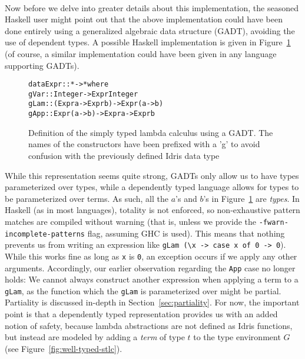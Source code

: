 \paragraph{}
Now before we delve into greater details about this implementation, the seasoned Haskell user might point out that the above implementation could have been done entirely using a generalized algebraic data structure (GADT), avoiding the use of dependent types. A possible Haskell implementation is given in Figure~\ref{fig:stlc-GADT} (of course, a similar implementation could have been given in any language supporting GADTs).

\begin{figure}
\begin{alltt}
data Expr :: * -> * where
  gVar :: Integer -> Expr Integer
  gLam :: (Expr a -> Expr b) -> Expr (a -> b)
  gApp :: Expr (a -> b) -> Expr a -> Expr b	
\end{alltt}
\caption{Definition of the simply typed lambda calculus using a GADT. The names of the constructors have been prefixed with a 'g' to avoid confusion with the previously defined Idris data type}
\label{fig:stlc-GADT}
\end{figure}

While this representation seems quite strong, GADTs only allow us to have types parameterized over types, while a dependently typed language allows for types to be parameterized over terms. As such, all the $a$'s and $b$'s in Figure~\ref{fig:stlc-GADT} are \emph{types}. In Haskell (as in most languages), totality is not enforced, so non-exhaustive pattern matches are compiled without warning (that is, unless we provide the \texttt{-fwarn-incomplete-patterns} flag, assuming GHC is used). This means that nothing prevents us from writing an expression like \texttt{gLam (\textbackslash{x} -> case x of 0 -> 0}). While this works fine as long as \texttt{x} is \texttt{0}, an exception occurs if we apply any other arguments. Accordingly, our earlier observation regarding the \texttt{App} case no longer holds: We cannot always construct another expression when applying a term to a \texttt{gLam}, as the function which the \texttt{gLam} is parameterized over might be partial. Partiality is discussed in-depth in Section~\ref{sec:partiality}. For now, the important point is that a dependently typed representation provides us with an added notion of safety, because lambda abstractions are not defined as Idris functions, but instead are modeled by adding a \emph{term} of type $t$ to the type environment $G$ (see Figure~\ref{fig:well-typed-stlc}).

